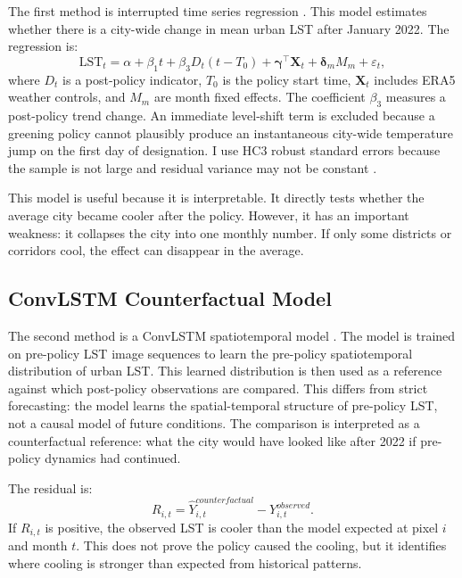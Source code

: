 \documentclass{article}
\begin{document}
The first method is interrupted time series regression \citep{Bernal2017}. This
model estimates whether there is a city-wide change in mean urban LST after
January 2022. The
regression is:
\begin{equation}
\mathrm{LST}_t = \alpha + \beta_1 t + \beta_3 D_t(t-T_0)
+ \boldsymbol{\gamma}^{\top}\mathbf{X}_t + \boldsymbol{\delta}_m M_m
+ \varepsilon_t,
\end{equation}
where $D_t$ is a post-policy indicator, $T_0$ is the policy start time,
$\mathbf{X}_t$ includes ERA5 weather controls, and $M_m$ are month fixed
effects. The coefficient $\beta_3$ measures a post-policy trend change.
An immediate level-shift term is excluded because a greening policy cannot
plausibly produce an instantaneous city-wide temperature jump on the first
day of designation. I use HC3 robust standard errors because the sample is
not large and residual variance may not be constant \citep{MacKinnon1985}.

This model is useful because it is interpretable. It directly tests whether the
average city became cooler after the policy. However, it has an important
weakness: it collapses the city into one monthly number. If only some districts
or corridors cool, the effect can disappear in the average.

\subsection{ConvLSTM Counterfactual Model}

The second method is a ConvLSTM spatiotemporal model \citep{Shi2015}. The model
is trained on pre-policy LST image sequences to learn the pre-policy
spatiotemporal distribution of urban LST. This learned distribution is then
used as a reference against which post-policy observations are compared.
This differs from strict forecasting: the model learns the spatial-temporal
structure of pre-policy LST, not a causal model of future conditions. The
comparison is interpreted as a counterfactual reference: what the city would
have looked like after 2022 if pre-policy dynamics had continued.

The residual is:
\begin{equation}
R_{i,t} = \widehat{Y}_{i,t}^{counterfactual} - Y_{i,t}^{observed}.
\label{eq:residual}
\end{equation}
If $R_{i,t}$ is positive, the observed LST is cooler than the model expected at
pixel $i$ and month $t$. This does not prove the policy caused the cooling, but
it identifies where cooling is stronger than expected from historical patterns.
\end{document}
